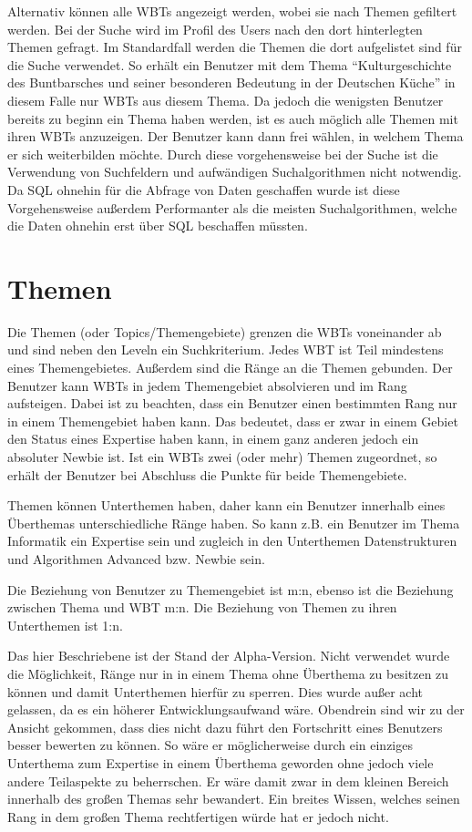 Alternativ können alle WBTs angezeigt werden, wobei sie nach Themen gefiltert
werden. Bei der Suche wird im Profil des Users nach den dort hinterlegten Themen
gefragt. Im Standardfall werden die Themen die dort aufgelistet sind für die
Suche verwendet. So erhält ein Benutzer mit dem Thema "`Kulturgeschichte des
Buntbarsches und seiner besonderen Bedeutung in der Deutschen Küche"' in
diesem Falle nur WBTs aus diesem Thema. Da jedoch die wenigsten Benutzer bereits
zu beginn ein Thema haben werden, ist es auch möglich alle Themen mit ihren WBTs
anzuzeigen. Der Benutzer kann dann frei wählen, in welchem Thema er sich
weiterbilden möchte. Durch diese vorgehensweise bei der Suche ist die Verwendung
von Suchfeldern und aufwändigen Suchalgorithmen nicht notwendig. Da SQL ohnehin
für die Abfrage von Daten geschaffen wurde ist diese Vorgehensweise außerdem
Performanter als die meisten Suchalgorithmen, welche die Daten ohnehin erst über
SQL beschaffen müssten.
\newpage
\section{Themen}
Die Themen (oder Topics/Themengebiete) grenzen die WBTs voneinander ab und sind
neben den Leveln ein Suchkriterium. Jedes WBT ist Teil mindestens eines
Themengebietes. Außerdem sind die Ränge an die Themen gebunden. Der Benutzer
kann WBTs in jedem Themengebiet absolvieren und im Rang aufsteigen. Dabei ist zu
beachten, dass ein Benutzer einen bestimmten Rang nur in einem Themengebiet
haben kann. Das bedeutet, dass er zwar in einem Gebiet den Status eines
Expertise haben kann, in einem ganz anderen jedoch ein absoluter Newbie ist. Ist
ein WBTs zwei (oder mehr) Themen zugeordnet, so erhält der Benutzer bei
Abschluss die Punkte für beide Themengebiete. 

Themen können Unterthemen haben, daher kann ein Benutzer innerhalb eines
Überthemas unterschiedliche Ränge haben. So kann z.B. ein Benutzer im Thema
Informatik ein Expertise sein und zugleich in den Unterthemen Datenstrukturen
und Algorithmen Advanced bzw. Newbie sein.

Die Beziehung von Benutzer zu Themengebiet ist m:n, ebenso ist die Beziehung
zwischen Thema und WBT m:n. Die Beziehung von Themen zu ihren Unterthemen ist
1:n. 

Das hier Beschriebene ist der Stand der Alpha-Version. Nicht verwendet wurde die
Möglichkeit, Ränge nur in in einem Thema ohne Überthema zu besitzen zu können
und damit Unterthemen hierfür zu sperren. Dies wurde außer acht gelassen, da es
ein höherer Entwicklungsaufwand wäre. Obendrein sind wir zu der Ansicht
gekommen, dass dies nicht dazu führt den Fortschritt eines Benutzers besser
bewerten zu können. So wäre er möglicherweise durch ein einziges Unterthema zum
Expertise in einem Überthema geworden ohne jedoch viele andere Teilaspekte zu
beherrschen. Er wäre damit zwar in dem kleinen Bereich innerhalb des großen
Themas sehr bewandert. Ein breites Wissen, welches seinen Rang in dem großen
Thema rechtfertigen würde hat er jedoch nicht.

